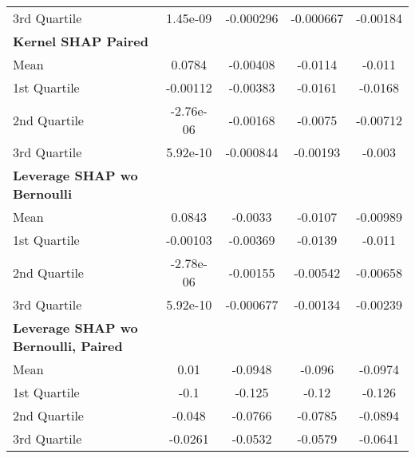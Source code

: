 {\begin{tabular} {lcccc}
\hspace{7pt}3rd Quartile & 1.45e-09 & -0.000296 & -0.000667 & -0.00184 \\ 
\addlinespace[1ex] 
\textbf{Kernel SHAP Paired} &  &  &  &  \\ 
\hspace{7pt}Mean & \cellcolor{bronze!60}0.0784 & -0.00408 & -0.0114 & -0.011 \\ 
\hspace{7pt}1st Quartile & \cellcolor{bronze!60}-0.00112 & -0.00383 & -0.0161 & -0.0168 \\ 
\hspace{7pt}2nd Quartile & -2.76e-06 & -0.00168 & -0.0075 & -0.00712 \\ 
\hspace{7pt}3rd Quartile & 5.92e-10 & -0.000844 & -0.00193 & -0.003 \\ 
\addlinespace[1ex] 
\textbf{Leverage SHAP wo Bernoulli} &  &  &  &  \\ 
\hspace{7pt}Mean & 0.0843 & -0.0033 & -0.0107 & -0.00989 \\ 
\hspace{7pt}1st Quartile & -0.00103 & -0.00369 & -0.0139 & -0.011 \\ 
\hspace{7pt}2nd Quartile & \cellcolor{bronze!60}-2.78e-06 & -0.00155 & -0.00542 & -0.00658 \\ 
\hspace{7pt}3rd Quartile & \cellcolor{bronze!60}5.92e-10 & -0.000677 & -0.00134 & -0.00239 \\ 
\addlinespace[1ex] 
\textbf{Leverage SHAP wo Bernoulli, Paired} &  &  &  &  \\ 
\hspace{7pt}Mean & \cellcolor{silver!60}0.01 & \cellcolor{silver!60}-0.0948 & \cellcolor{silver!60}-0.096 & \cellcolor{silver!60}-0.0974 \\ 
\hspace{7pt}1st Quartile & \cellcolor{silver!60}-0.1 & \cellcolor{silver!60}-0.125 & \cellcolor{silver!60}-0.12 & \cellcolor{silver!60}-0.126 \\ 
\hspace{7pt}2nd Quartile & \cellcolor{silver!60}-0.048 & \cellcolor{silver!60}-0.0766 & \cellcolor{silver!60}-0.0785 & \cellcolor{silver!60}-0.0894 \\ 
\hspace{7pt}3rd Quartile & \cellcolor{silver!60}-0.0261 & \cellcolor{silver!60}-0.0532 & \cellcolor{silver!60}-0.0579 & \cellcolor{silver!60}-0.0641 \\ 
\bottomrule
\end{tabular}}
